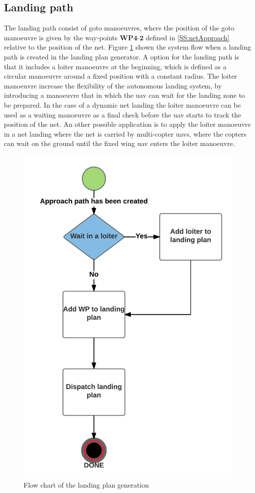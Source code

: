 \subsection{Landing path}
The landing path consist of goto manoeuvres, where the position of the goto manoeuvre is given by the way-points $\textbf{WP4-2}$ defined in \ref{SS:netApproach} relative to the position of the net. Figure \ref{Fig:FlowChartLanding} shown the system flow when a landing path is created in the landing plan generator. A option for the landing path is that it includes a loiter manoeuvre at the beginning, which is defined as a circular manoeuvre around a fixed position with a constant radius. The loiter manoeuvre increase the flexibility of the autonomous landing system, by introducing a manoeuvre that in which the \gls{uav} can wait for the landing zone to be prepared. In the case of a dynamic net landing the loiter manoeuvre can be used as a waiting manoeuvre as a final check before the \gls{uav} starts to track the position of the net. An other possible application is to apply the loiter manoeuvre in a net landing where the net is carried by multi-copter \glspl{uav}, where the copters can wait on the ground until the fixed wing \gls{uav} enters the loiter manoeuvre.
\begin{figure}
\centering
\includegraphics[scale=0.8]{figs/LandingPath.png}
\caption{Flow chart of the landing plan generation}
\label{Fig:FlowChartLanding}
\end{figure}

